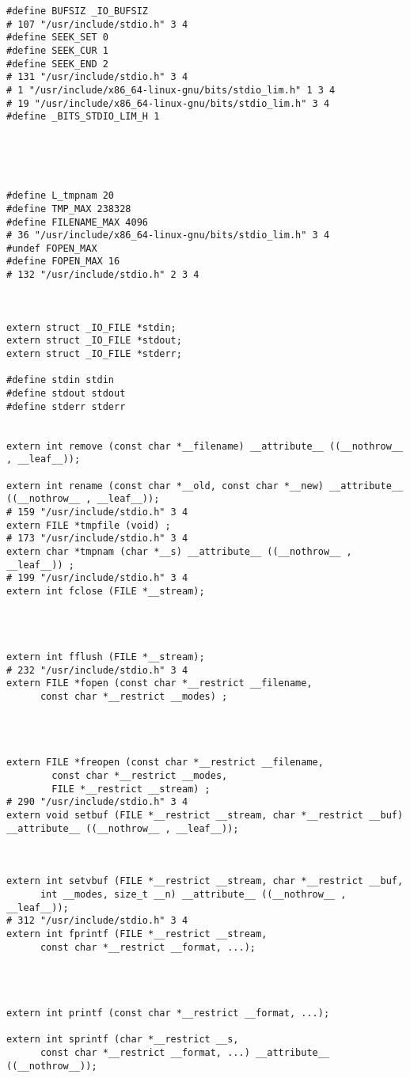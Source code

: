 \documentclass[11pt]{article}
\begin{document}
\begin{verbatim}
#define BUFSIZ _IO_BUFSIZ
# 107 "/usr/include/stdio.h" 3 4
#define SEEK_SET 0
#define SEEK_CUR 1
#define SEEK_END 2
# 131 "/usr/include/stdio.h" 3 4
# 1 "/usr/include/x86_64-linux-gnu/bits/stdio_lim.h" 1 3 4
# 19 "/usr/include/x86_64-linux-gnu/bits/stdio_lim.h" 3 4
#define _BITS_STDIO_LIM_H 1





#define L_tmpnam 20
#define TMP_MAX 238328
#define FILENAME_MAX 4096
# 36 "/usr/include/x86_64-linux-gnu/bits/stdio_lim.h" 3 4
#undef FOPEN_MAX
#define FOPEN_MAX 16
# 132 "/usr/include/stdio.h" 2 3 4



extern struct _IO_FILE *stdin;
extern struct _IO_FILE *stdout;
extern struct _IO_FILE *stderr;

#define stdin stdin
#define stdout stdout
#define stderr stderr


extern int remove (const char *__filename) __attribute__ ((__nothrow__ , __leaf__));

extern int rename (const char *__old, const char *__new) __attribute__ ((__nothrow__ , __leaf__));
# 159 "/usr/include/stdio.h" 3 4
extern FILE *tmpfile (void) ;
# 173 "/usr/include/stdio.h" 3 4
extern char *tmpnam (char *__s) __attribute__ ((__nothrow__ , __leaf__)) ;
# 199 "/usr/include/stdio.h" 3 4
extern int fclose (FILE *__stream);




extern int fflush (FILE *__stream);
# 232 "/usr/include/stdio.h" 3 4
extern FILE *fopen (const char *__restrict __filename,
      const char *__restrict __modes) ;




extern FILE *freopen (const char *__restrict __filename,
        const char *__restrict __modes,
        FILE *__restrict __stream) ;
# 290 "/usr/include/stdio.h" 3 4
extern void setbuf (FILE *__restrict __stream, char *__restrict __buf) __attribute__ ((__nothrow__ , __leaf__));



extern int setvbuf (FILE *__restrict __stream, char *__restrict __buf,
      int __modes, size_t __n) __attribute__ ((__nothrow__ , __leaf__));
# 312 "/usr/include/stdio.h" 3 4
extern int fprintf (FILE *__restrict __stream,
      const char *__restrict __format, ...);




extern int printf (const char *__restrict __format, ...);

extern int sprintf (char *__restrict __s,
      const char *__restrict __format, ...) __attribute__ ((__nothrow__));






\end{verbatim}
\end{document}
